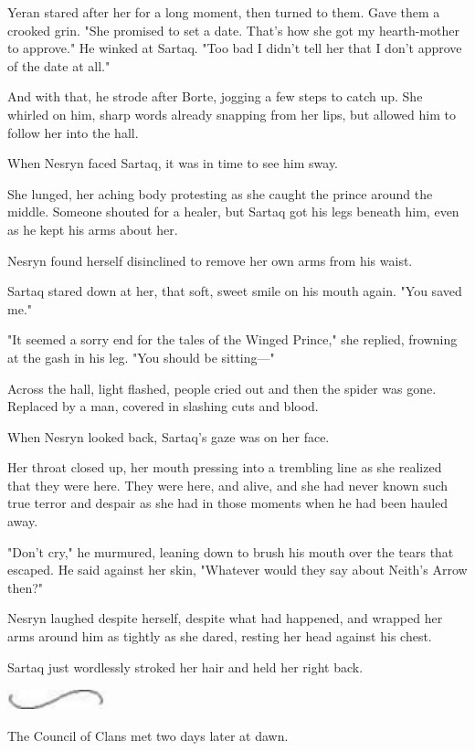 Yeran stared after her for a long moment, then turned to them. Gave them a crooked grin. "She promised to set a date. That's how she got my hearth-mother to approve." He winked at Sartaq. "Too bad I didn't tell her that I don't approve of the date at all."

And with that, he strode after Borte, jogging a few steps to catch up. She whirled on him, sharp words already snapping from her lips, but allowed him to follow her into the hall.

When Nesryn faced Sartaq, it was in time to see him sway.

She lunged, her aching body protesting as she caught the prince around the middle. Someone shouted for a healer, but Sartaq got his legs beneath him, even as he kept his arms about her.

Nesryn found herself disinclined to remove her own arms from his waist.

Sartaq stared down at her, that soft, sweet smile on his mouth again. "You saved me."

"It seemed a sorry end for the tales of the Winged Prince," she replied, frowning at the gash in his leg. "You should be sitting---"

Across the hall, light flashed, people cried out  and then the spider was gone. Replaced by a man, covered in slashing cuts and blood.

When Nesryn looked back, Sartaq's gaze was on her face.

Her throat closed up, her mouth pressing into a trembling line as she realized that they were here. They were here, and alive, and she had never known such true terror and despair as she had in those moments when he had been hauled away.

"Don't cry," he murmured, leaning down to brush his mouth over the tears that escaped. He said against her skin, "Whatever would they say about Neith's Arrow then?"

Nesryn laughed despite herself, despite what had happened, and wrapped her arms around him as tightly as she dared, resting her head against his chest.

Sartaq just wordlessly stroked her hair and held her right back.

\includegraphics[width=1.12in,height=0.24in]{images/seperator}

The Council of Clans met two days later at dawn.

